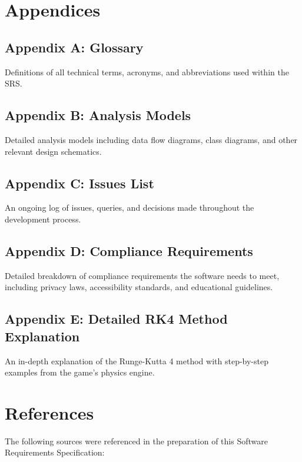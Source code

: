 \documentclass[12pt]{article}
\begin{document}
\section{Appendices}
\subsection{Appendix A: Glossary}
Definitions of all technical terms, acronyms, and abbreviations used within the SRS.

\subsection{Appendix B: Analysis Models}
Detailed analysis models including data flow diagrams, class diagrams, and other relevant design schematics.

\subsection{Appendix C: Issues List}
An ongoing log of issues, queries, and decisions made throughout the development process.

\subsection{Appendix D: Compliance Requirements}
Detailed breakdown of compliance requirements the software needs to meet, including privacy laws, accessibility standards, and educational guidelines.

\subsection{Appendix E: Detailed RK4 Method Explanation}
An in-depth explanation of the Runge-Kutta 4 method with step-by-step examples from the game's physics engine.

\section{References}
The following sources were referenced in the preparation of this Software Requirements Specification:
\end{document}
